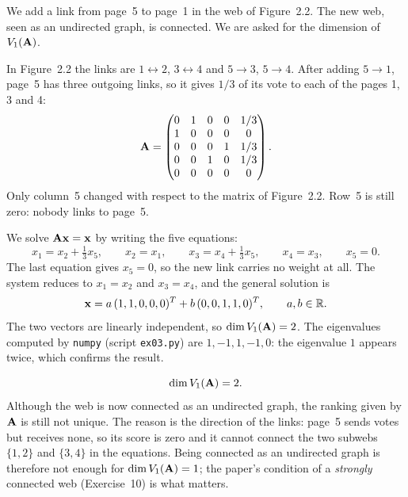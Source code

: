 

We add a link from page~5 to page~1 in the web of Figure~2.2.
The new web, seen as an undirected graph, is connected.
We are asked for the dimension of $V_1(\mathbf{A})$.


In Figure~2.2 the links are $1 \leftrightarrow 2$, $3 \leftrightarrow 4$ and $5 \to 3$, $5 \to 4$.
After adding $5 \to 1$, page~5 has three outgoing links, so it gives $1/3$ of its vote to each of the pages 1, 3 and 4:
\[
  \mathbf{A} = \begin{pmatrix}
    0 & 1 & 0 & 0 & 1/3\\
    1 & 0 & 0 & 0 & 0\\
    0 & 0 & 0 & 1 & 1/3\\
    0 & 0 & 1 & 0 & 1/3\\
    0 & 0 & 0 & 0 & 0
  \end{pmatrix}.
\]
Only column~5 changed with respect to the matrix of Figure~2.2.
Row~5 is still zero: nobody links to page~5.


We solve $\mathbf{A}\mathbf{x} = \mathbf{x}$ by writing the five equations:
\[
  x_1 = x_2 + \tfrac{1}{3}x_5, \qquad
  x_2 = x_1, \qquad
  x_3 = x_4 + \tfrac{1}{3}x_5, \qquad
  x_4 = x_3, \qquad
  x_5 = 0 .
\]
The last equation gives $x_5 = 0$, so the new link carries no weight at all.
The system reduces to $x_1 = x_2$ and $x_3 = x_4$, and the general solution is
\[
  \mathbf{x} = a\,(1,1,0,0,0)^T + b\,(0,0,1,1,0)^T, \qquad a,b \in \mathbb{R}.
\]
The two vectors are linearly independent, so $\dim V_1(\mathbf{A}) = 2$.
The eigenvalues computed by \texttt{numpy} (script \texttt{ex03.py}) are $1,-1,1,-1,0$: the eigenvalue $1$ appears twice, which confirms the result.


\[
  \dim V_1(\mathbf{A}) = 2 .
\]
Although the web is now connected as an undirected graph, the ranking given by $\mathbf{A}$ is still not unique.
The reason is the direction of the links: page~5 sends votes but receives none, so its score is zero and it cannot connect the two subwebs $\{1,2\}$ and $\{3,4\}$ in the equations.
Being connected as an undirected graph is therefore not enough for $\dim V_1(\mathbf{A}) = 1$; the paper's condition of a \emph{strongly} connected web (Exercise~10) is what matters.
